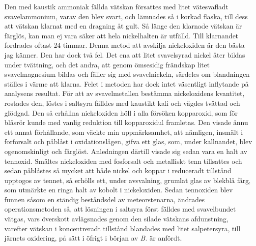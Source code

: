 \documentclass[a4paper, 12pt, oneside, swedish]{article}
\begin{document}
Den med kaustik ammoniak fällda vätskan försattes med litet vätesvafladt svavelammonium, varav den blev svart, och lämnades så i korkad flaska, till dess att vätskan klarnat med en dragning åt gult. Så länge den klarnade vätskan är färglös, kan man ej vara säker att hela nickelhalten är utfälld. Till klarnandet fordrades oftast 24 timmar. Denna metod att avskilja nickeloxiden är den bästa jag känner. Den har dock två fel. Det ena att litet svavelsyrad nickel åter bildas under tvättning, och det andra, att genom ömsesidig frändskap litet svavelmagnesium bildas och fäller sig med svavelnickeln, särdeles om blandningen ställes i värme att klarna. Felet i metoden har dock intet väsentligt inflytande på analysens resultat. För att av svavelmetallen bestämma nickeloxidens kvantitet, rostades den, löstes i saltsyra fälldes med kaustikt kali och vägdes tvättad och glödgad. Den så erhållna nickeloxiden höll i alla försöken kopparoxid, som för blåsrör kunde med vanlig reduktion till kopparoxidul framletas. Den visade ännu ett annat förhållande, som väckte min uppmärksamhet, att nämligen, insmält i forforsalt och påblåst i oxidationslågen, gifva ett glas, som, under kallnandet, blev ogenomskinligt och färglöst. Anledningen därtill visade sig sedan vara en halt av tennoxid. Smältes nickeloxiden med fosforsalt och metalliskt tenn tillsattes och sedan påblåstes så mycket att både nickel och koppar i reduceradt tillstånd upptogos av tennet, så erhölls ett, under avsvalning, grumlat glas av blekblå färg, som utmärkte en ringa halt av kobolt i nickeloxiden. Sedan tennoxiden blev funnen såsom en ständig beståndsdel av meteorstenarna, ändrades operationsmetoden så, att lösningen i saltsyra först fälldes med svavelbundet vätgas, vars överskott avlägsnades genom den silade vätskans afdunstning, varefter vätskan i koncentreradt tillstånd blandades med litet salpetersyra, till järnets oxidering, på sätt i öfrigt i början av \emph{B.} är anfördt.
\end{document}
